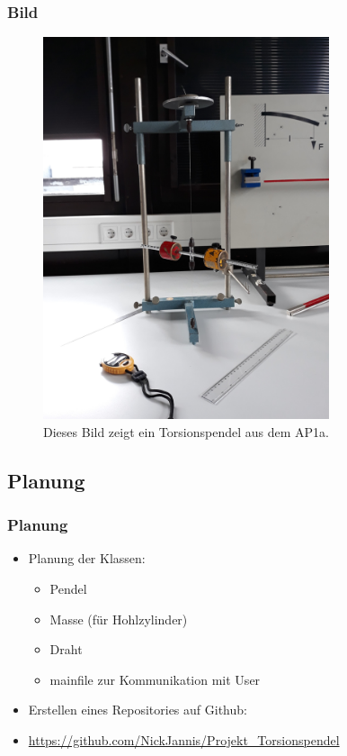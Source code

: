\documentclass[11pt]{beamer}
\begin{document}
\begin{frame}
\frametitle{Bild}
\begin{figure} [H]
\centering
\includegraphics[width=0.75\textwidth]{Teil_2.jpg}
\caption{Dieses Bild zeigt ein Torsionspendel aus dem AP1a.}
\end{figure}
\end{frame}

\subsection{Planung}
\begin{frame}
\frametitle{Planung}
\begin{itemize}
\item Planung der Klassen:
\begin{itemize}
\item Pendel
\item Masse (für Hohlzylinder)
\item Draht
\item mainfile zur Kommunikation mit User
\end{itemize}\pause
\item Erstellen eines Repositories auf Github:
\item \url{https://github.com/NickJannis/Projekt_Torsionspendel}
\end{itemize}
\end{frame}
\end{document}
